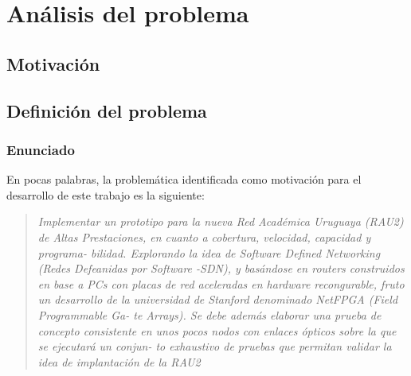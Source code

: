 
\chapter{An\'alisis del problema}

\ifpdf
    \graphicspath{{Chapter2/Figs/Raster/}{Chapter2/Figs/PDF/}{Chapter2/Figs/}}
\else
    \graphicspath{{Chapter2/Figs/Vector/}{Chapter2/Figs/}}
\fi


\section[Motivaci\'on]{Motivaci\'on}



\section[Definici\'on del problema]{Definici\'on del problema}

\subsection[Enunciado]{Enunciado}


En pocas palabras, la problem\'atica identificada como motivaci\'on para el desarrollo de este trabajo es la siguiente:

\begin{quote}
\textit{Implementar un prototipo para la nueva Red Académica Uruguaya (RAU2) de
Altas Prestaciones, en cuanto a cobertura, velocidad, capacidad y programa-
bilidad. Explorando la idea de Software Defined Networking (Redes Defeanidas
por Software -SDN), y basándose en routers construidos en base a PCs con
placas de red aceleradas en hardware recongurable, fruto un desarrollo de
la universidad de Stanford denominado NetFPGA (Field Programmable Ga-
te Arrays). Se debe además elaborar una prueba de concepto consistente en
unos pocos nodos con enlaces ópticos sobre la que se ejecutará un conjun-
to exhaustivo de pruebas que permitan validar la idea de implantación de la
RAU2}
\end{quote}

